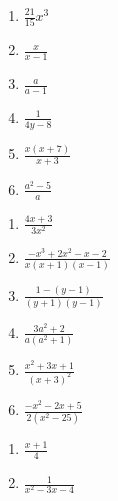 \begin{respostas}{5}
    
    \ansitem{} \begin{multicols}{3}
        \begin{enumerate}[label=\alph*)]
            \item $\frac{21}{15}x^3$
            
            \item $\frac{x}{x -1}$
            
            \item $\frac{a}{a-1}$
            
            \item $\frac{1}{4y-8}$
            
            \item $\frac{x(x+7)}{x+3}$
            
            \item $\frac{a^2-5}{a}$
        \end{enumerate}
    \end{multicols}
    
    \ansitem{} \begin{multicols}{3}
        \begin{enumerate}[label=\alph*)]
            \item $\frac{4x+3}{3x^2}$
            
            \item $\frac{-x^3+2x^2-x-2}{x(x+1)(x-1)}$
            
            \item $\frac{1-(y-1)}{(y+1)(y-1)}$
            
            \item $\frac{3a^2+2}{a(a^2+1)}$
            
            \item $\frac{x^2+3x+1}{(x+3)^2}$
            
            \item $\frac{-x^2-2x+5}{2(x^2-25)}$
        \end{enumerate}
    \end{multicols}
    
    \ansitem{} \begin{multicols}{3}
        \begin{enumerate}[label=\alph*)]
            \item $\frac{x+1}{4}$
            
            \item $\frac{1}{x^2-3x-4}$
            

\end{enumerate}
\end{multicols}
\end{respostas}
